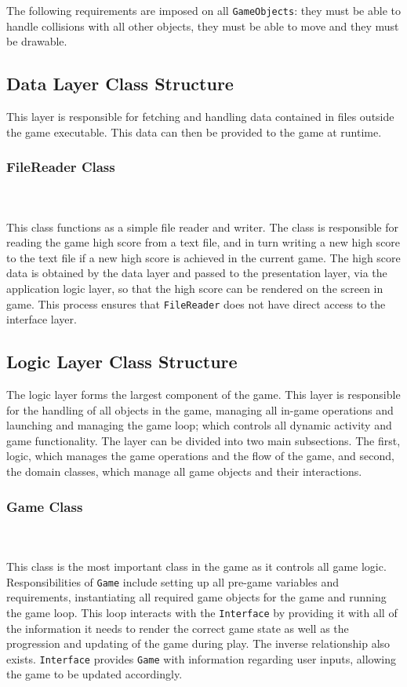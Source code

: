 \documentclass[10pt,twocolumn]{witseiepaper}
\begin{document}
The following requirements are imposed on all \texttt{GameObjects}: they must be able to handle collisions with all other objects, they must be able to move and they must be drawable. 

\subsection{Data Layer Class Structure}

This layer is responsible for fetching and handling data contained in files outside the game executable. This data can then be provided to the game at runtime.

\subsubsection{FileReader Class}
~\\
~\\
This class functions as a simple file reader and writer. The class is responsible for reading the game high score from a text file, and in turn writing a new high score to the text file if a new high score is achieved in the current game. The high score data is obtained by the data layer and passed to the presentation layer, via the application logic layer, so that the high score can be rendered on the screen in game. This process ensures that \texttt{FileReader} does not have direct access to the interface layer.

\subsection{Logic Layer Class Structure}

The logic layer forms the largest component of the game. This layer is responsible for the handling of all objects in the game, managing all in-game operations and launching and managing the game loop; which controls all dynamic activity and game functionality. The layer can be divided into two main subsections. The first, logic, which manages the game operations and the flow of the game, and second, the domain classes, which manage all game objects and their interactions. 

\subsubsection{Game Class}
~\\
~\\
This class is the most important class in the game as it controls all game logic. Responsibilities of \texttt{Game} include setting up all pre-game variables and requirements, instantiating all required game objects for the game and running the game loop. This loop interacts with the \texttt{Interface} by providing it with all of the information it needs to render the correct game state as well as the progression and updating of the game during play. The inverse relationship also exists. \texttt{Interface} provides \texttt{Game} with information regarding user inputs, allowing the game to be updated accordingly. 
\end{document}
